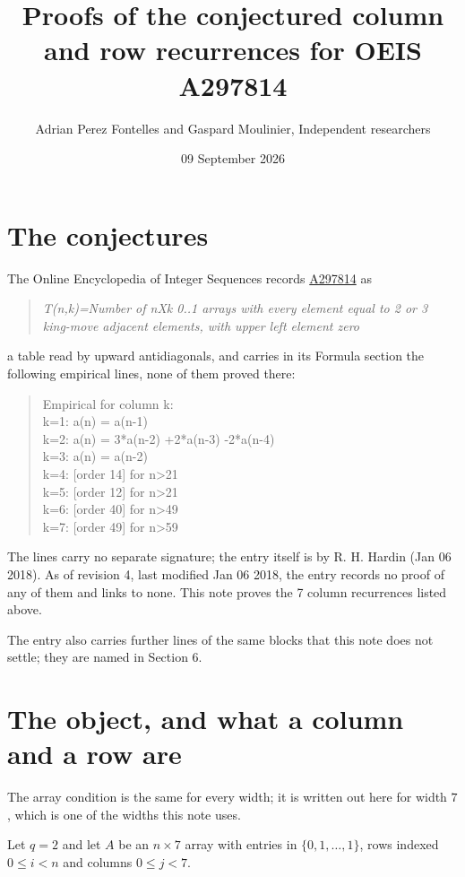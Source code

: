\documentclass[11pt]{article}
\title{Proofs of the conjectured column and row recurrences for OEIS A297814}
\author{Adrian Perez Fontelles and Gaspard Moulinier, Independent researchers}
\date{09 September 2026}
\theoremstyle{definition}
\begin{document}
\maketitle
\section{The conjectures}

The Online Encyclopedia of Integer Sequences records \href{https://oeis.org/A297814}{A297814} as

\begin{quote}\itshape T(n,k)=Number of nXk 0..1 arrays with every element equal to 2 or 3 king-move adjacent elements, with upper left element zero\end{quote}

a table read by upward antidiagonals, and carries in its Formula section the following empirical lines, none of them proved there:

\begin{quote}\ttfamily Empirical for column k:\\
k=1: a(n) = a(n-1)\\k=2: a(n) = 3*a(n-2) +2*a(n-3) -2*a(n-4)\\k=3: a(n) = a(n-2)\\k=4: [order 14] for n>21\\k=5: [order 12] for n>21\\k=6: [order 40] for n>49\\k=7: [order 49] for n>59\end{quote}

The lines carry no separate signature; the entry itself is by R. H. Hardin (Jan 06 2018). As of revision 4, last modified Jan 06 2018, the entry records no proof of any of them and links to none. This note proves the 7 column recurrences listed above.

The entry also carries further lines of the same blocks that this note does not settle; they are named in Section 6.

\section{The object, and what a column and a row are}

The array condition is the same for every width; it is written out here for width $7$, which is one of the widths this note uses.

Let $q = 2$ and let $A$ be an $n \times 7$ array with entries in $\{0,1,\dots,1\}$, rows indexed $0 \le i < n$ and columns $0 \le j < 7$.
\end{document}
